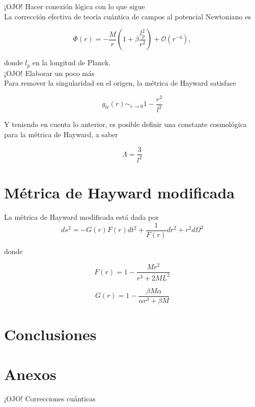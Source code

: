 \documentclass{article}
\numberwithin{equation}{section}
\begin{document}
¡OJO! Hacer conexión lógica con lo que sigue\\

La corrección efectiva de teoría cuántica de campos al potencial Newtoniano es

\begin{equation}
\label{newF}
\Phi (r) = -\frac{M}{r} \left( 1 + \beta \frac{l_{p}^2}{r^2} \right) + \mathcal{O}(r^{-4}),
\end{equation}

donde $l_{p}$ en la longitud de Planck.\\

¡OJO! Elaborar un poco más\\

Para remover la singularidad en el origen, la métrica de Hayward satisface 

\begin{equation}
g_{tt}(r) \sim_{r \to 0} 1 - \frac{r^2}{l^2}
\end{equation}

Y teniendo en cuenta lo anterior, es posible definir una constante cosmológica para la métrica de Hayward, a saber

\begin{equation}
\Lambda = \frac{3}{l^2}
\end{equation}

\section{Métrica de Hayward modificada}

La métrica de Hayward modificada está dada por 
\begin{equation}
\label{reg-schF}
ds^2 = -G(r)F(r) dt^2 + \frac{1}{F(r)} dr^2 + r^2d\Omega ^2
\end{equation}

donde

\begin{equation}
\label{mod-hay-f}
F(r) = 1 - \frac{Mr^2}{r^3 + 2ML^2}
\end{equation}

\begin{equation}
\label{mod-hay-g}
G(r) = 1 - \frac{\beta M \alpha}{\alpha r^3 + \beta M}
\end{equation}

\section{\label{conclusions} Conclusiones}

\section{\label{annex} Anexos}

¡OJO! Correcciones cuánticas\\


\nocite{*}


\end{document}
